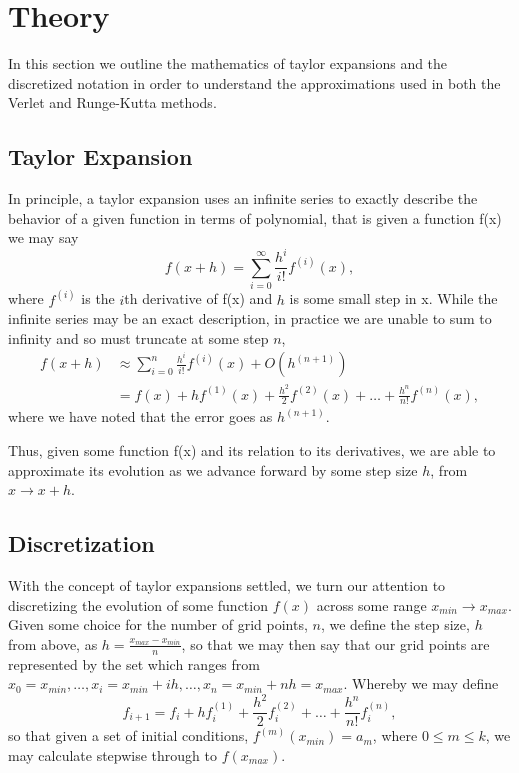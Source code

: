 \documentclass[11pt,a4paper]{article}
\begin{document}
\section{Theory}

In this section we outline the mathematics of taylor expansions and the discretized notation in order to understand the approximations used in both the Verlet and Runge-Kutta methods.

\subsection{Taylor Expansion}

In principle, a taylor expansion uses an infinite series to exactly describe the behavior of a given function in terms of polynomial, that is given a function f(x) we may say
\begin{equation}
f(x+h) = \sum\limits_{i=0}^{\infty} \frac{h^i}{i!}f^{(i)}(x),
\end{equation}
where $f^{(i)}$ is the $i$th derivative of f(x) and $h$ is some small step in x. While the infinite series may be an exact description, in practice we are unable to sum to infinity and so must truncate at some step $n$,
\begin{align}
f(x+h) 	&\approx \sum\limits_{i=0}^{n} \frac{h^i}{i!}f^{(i)}(x) + O(h^{(n+1)})\\
		&= f(x) + hf^{(1)}(x) + \frac{h^2}{2}f^{(2)}(x) + \dots + \frac{h^n}{n!}f^{(n)}(x),
\end{align}
where we have noted that the error goes as $h^{(n+1)}$. 

Thus, given some function f(x) and its relation to its derivatives, we are able to approximate its evolution as we advance forward by some step size $h$, from $x \rightarrow x+h$.

\subsection{Discretization}

With the concept of taylor expansions settled, we turn our attention to discretizing the evolution of some function $f(x)$ across some range $x_{min} \rightarrow x_{max}$. Given some choice for the number of grid points, $n$, we define the step size, $h$ from above, as $h = \frac{x_{max} - x_{min}}{n}$, so that we may then say that our grid points are represented by the set which ranges from $x_0 = x_{min}, \dots, x_i = x_{min} + ih, \dots, x_n = x_{min} + nh = x_{max}$. Whereby we may define
\begin{equation}
f_{i+1} = f_i + hf^{(1)}_i + \frac{h^2}{2}f^{(2)}_i + \dots + \frac{h^n}{n!}f^{(n)}_i,
\end{equation}
so that given a set of initial conditions, $f^{(m)}(x_{min}) = a_m$, where $0\leq m \leq k$, we may calculate stepwise through to $f(x_{max})$.
\end{document}
